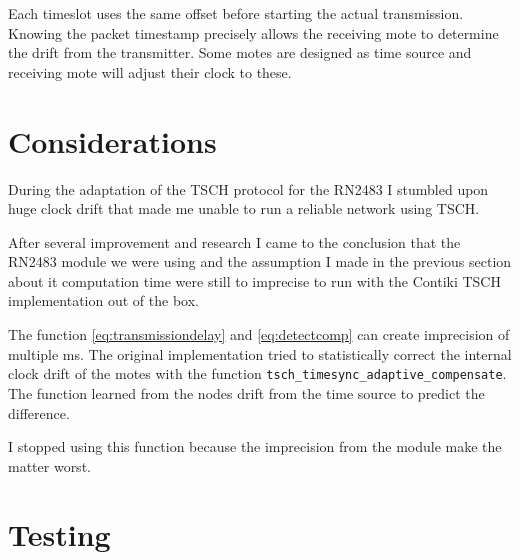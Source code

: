 Each timeslot uses the same offset before starting the actual transmission.
Knowing the packet timestamp precisely allows the receiving mote to determine the
drift from the transmitter. Some motes are designed as time source and
receiving mote will adjust their clock to these.




\section{Considerations}

During the adaptation of the TSCH protocol for the RN2483 I stumbled upon huge
clock drift that made me unable to run a reliable network using TSCH.

After several improvement and research I came to the conclusion that the RN2483
module we were using and the assumption I made in the previous section about it
computation time were still to imprecise to run with the Contiki TSCH
implementation out of the box.

The function \ref{eq:transmissiondelay} and \ref{eq:detectcomp} can
create imprecision of multiple ms.
The original implementation tried to statistically correct the internal clock
drift of the motes with the function
\lstinline{tsch_timesync_adaptive_compensate}.
The function learned from the nodes drift from the time source to predict the
difference.

I stopped using this function because the imprecision from the module make the
matter worst.

\section{Testing}

